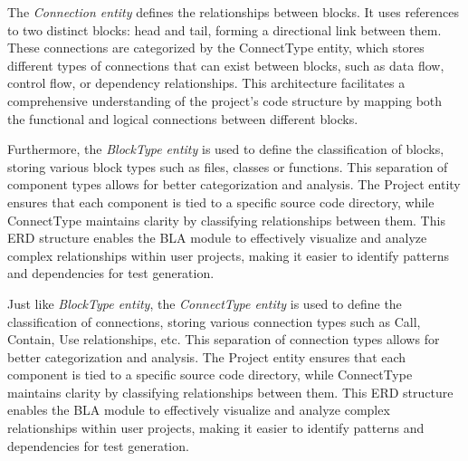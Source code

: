 \hspace{0.5cm} The \textit{Connection entity} defines the relationships between blocks. It uses references to two distinct blocks: head and tail, forming a directional link between them. These connections are categorized by the ConnectType entity, which stores different types of connections that can exist between blocks, such as data flow, control flow, or dependency relationships. This architecture facilitates a comprehensive understanding of the project's code structure by mapping both the functional and logical connections between different blocks.

\hspace{0.5cm}Furthermore, the \textit{BlockType entity} is used to define the classification of blocks, storing various block types such as files, classes or functions. This separation of component types allows for better categorization and analysis. The Project entity ensures that each component is tied to a specific source code directory, while ConnectType maintains clarity by classifying relationships between them. This ERD structure enables the BLA module to effectively visualize and analyze complex relationships within user projects, making it easier to identify patterns and dependencies for test generation.

\hspace{0.5cm} Just like \textit{BlockType entity}, the \textit{ConnectType entity} is used to define the classification of connections, storing various connection types such as Call, Contain, Use relationships, etc. This separation of connection types allows for better categorization and analysis. The Project entity ensures that each component is tied to a specific source code directory, while ConnectType maintains clarity by classifying relationships between them. This ERD structure enables the BLA module to effectively visualize and analyze complex relationships within user projects, making it easier to identify patterns and dependencies for test generation.
                                                                                                                                              



